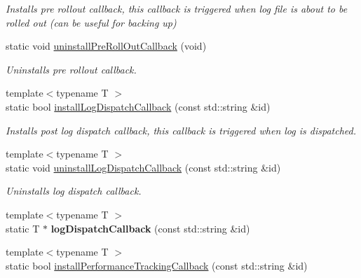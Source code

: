 \begin{DoxyCompactItemize}
\begin{DoxyCompactList}\small\item\em Installs pre rollout callback, this callback is triggered when log file is about to be rolled out (can be useful for backing up) \end{DoxyCompactList}\item 
static void \hyperlink{classel_1_1Helpers_ab829e5ed1b43bf965f5c288bc0280376}{uninstall\+Pre\+Roll\+Out\+Callback} (void)\hypertarget{classel_1_1Helpers_ab829e5ed1b43bf965f5c288bc0280376}{}\label{classel_1_1Helpers_ab829e5ed1b43bf965f5c288bc0280376}

\begin{DoxyCompactList}\small\item\em Uninstalls pre rollout callback. \end{DoxyCompactList}\item 
{\footnotesize template$<$typename T $>$ }\\static bool \hyperlink{classel_1_1Helpers_a3f3e84057567a8ac568a35899318544a}{install\+Log\+Dispatch\+Callback} (const std\+::string \&id)\hypertarget{classel_1_1Helpers_a3f3e84057567a8ac568a35899318544a}{}\label{classel_1_1Helpers_a3f3e84057567a8ac568a35899318544a}

\begin{DoxyCompactList}\small\item\em Installs post log dispatch callback, this callback is triggered when log is dispatched. \end{DoxyCompactList}\item 
{\footnotesize template$<$typename T $>$ }\\static void \hyperlink{classel_1_1Helpers_ac94b44cc8d399a5842703126478300d7}{uninstall\+Log\+Dispatch\+Callback} (const std\+::string \&id)\hypertarget{classel_1_1Helpers_ac94b44cc8d399a5842703126478300d7}{}\label{classel_1_1Helpers_ac94b44cc8d399a5842703126478300d7}

\begin{DoxyCompactList}\small\item\em Uninstalls log dispatch callback. \end{DoxyCompactList}\item 
{\footnotesize template$<$typename T $>$ }\\static T $\ast$ {\bfseries log\+Dispatch\+Callback} (const std\+::string \&id)\hypertarget{classel_1_1Helpers_aa01d59ca141bc75c4fdd78a34234611b}{}\label{classel_1_1Helpers_aa01d59ca141bc75c4fdd78a34234611b}

\item 
{\footnotesize template$<$typename T $>$ }\\static bool \hyperlink{classel_1_1Helpers_a93e2727d3a7a5c06ccc41a2ae7fe1835}{install\+Performance\+Tracking\+Callback} (const std\+::string \&id)\hypertarget{classel_1_1Helpers_a93e2727d3a7a5c06ccc41a2ae7fe1835}{}\label{classel_1_1Helpers_a93e2727d3a7a5c06ccc41a2ae7fe1835}


\end{DoxyCompactItemize}
